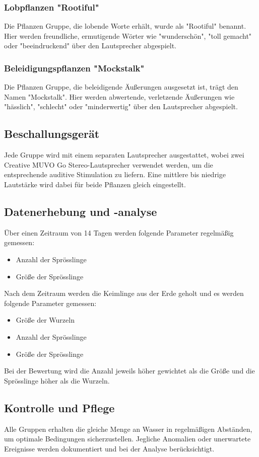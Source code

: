    \subsubsection{Lobpflanzen "Rootiful"}
    Die Pflanzen Gruppe, die lobende Worte erhält, wurde als "Rootiful" benannt. Hier werden freundliche, ermutigende Wörter wie "wunderschön", "toll gemacht" oder "beeindruckend" über den Lautsprecher abgespielt.
    
    \subsubsection{Beleidigungspflanzen "Mockstalk"}
    Die Pflanzen Gruppe, die beleidigende Äußerungen ausgesetzt ist, trägt den Namen "Mockstalk". Hier werden abwertende, verletzende Äußerungen wie "hässlich", "schlecht" oder "minderwertig" über den Lautsprecher abgespielt.

    \subsection{Beschallungsgerät}
    Jede Gruppe wird mit einem separaten Lautsprecher ausgestattet, wobei zwei \\ Creative MUVO Go Stereo-Lautsprecher verwendet werden, um die entsprechende auditive Stimulation zu liefern. Eine mittlere bis niedrige Lautstärke wird dabei für beide Pflanzen gleich eingestellt.

    \subsection{Datenerhebung und -analyse}
    Über einen Zeitraum von 14 Tagen werden folgende Parameter regelmäßig gemessen:
    \begin{itemize}
         \item Anzahl der Sprösslinge
         \item Größe der Sprösslinge
     \end{itemize}

    Nach dem Zeitraum werden die Keimlinge aus der Erde geholt und es werden folgende Parameter gemessen:
    \begin{itemize}
        \item Größe der Wurzeln
        \item Anzahl der Sprösslinge
        \item Größe der Sprösslinge
     \end{itemize}

    Bei der Bewertung wird die Anzahl jeweils höher gewichtet als die Größe und die Sprösslinge höher als die Wurzeln.
    
    \subsection{Kontrolle und Pflege}
    Alle Gruppen erhalten die gleiche Menge an Wasser in regelmäßigen Abständen, um optimale Bedingungen sicherzustellen. Jegliche Anomalien oder unerwartete Ereignisse werden dokumentiert und bei der Analyse berücksichtigt.